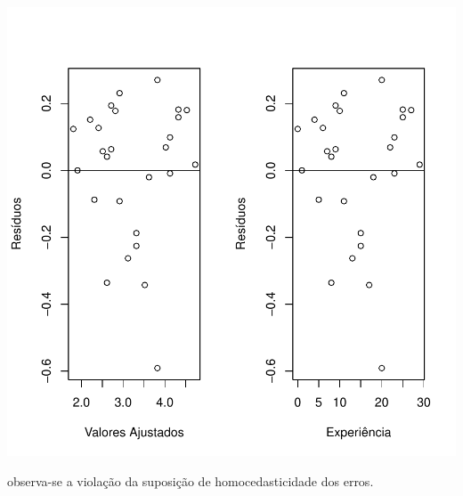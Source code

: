 \documentclass[14pt,aspectratio=1610]{beamer}
\begin{document}
\begin{frame}[fragile]{}
\frametitle{ }
\vspace{-0.5cm}
\begin{block}{}
\begin{center}
\includegraphics{Aula17-020}
\end{center}
\vspace{-0.5cm}
observa-se a violação da suposição de homocedasticidade dos erros.
\end{block}

\end{frame}
\end{document}
